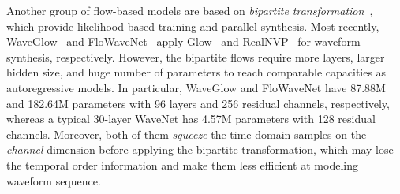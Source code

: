 \documentclass{article}
\begin{document}
Another group of flow-based models are based on \emph{bipartite transformation}~\citep{dinh2016density, kingma2018glow}, which provide likelihood-based training and parallel synthesis. 
Most recently, WaveGlow~\citep{prenger2019waveglow} and FloWaveNet~\citep{kim2018flowavenet} apply {Glow}~\citep{kingma2018glow} and {RealNVP}~\citep{dinh2016density} for waveform synthesis, respectively.
However, the bipartite flows require more layers, larger hidden size, and huge number of parameters to reach comparable capacities as autoregressive models. 
In particular, WaveGlow and FloWaveNet have 87.88M and 182.64M parameters with 96 layers and 256 residual channels, respectively, whereas a typical 30-layer WaveNet has 4.57M parameters with 128 residual channels.
Moreover, both of them \emph{squeeze} the time-domain samples on the \emph{channel} dimension before applying the bipartite transformation, which may lose the temporal order information and make them less efficient at modeling waveform sequence. 
\end{document}
